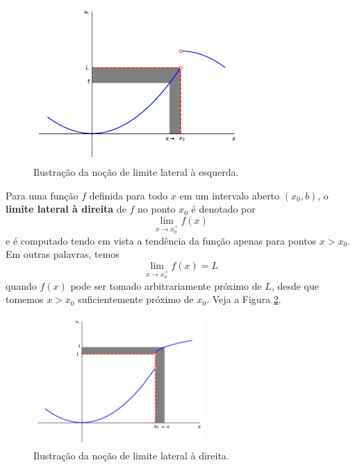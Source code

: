 \cleardoublepage\documentclass[../main.tex]{subfiles}
\begin{document}
\begin{figure}[H]
  \centering
  \includegraphics[width=0.7\textwidth]{fig_lim/fig_lim_esq}
  \caption{Ilustração da noção de limite lateral à esquerda.}
  \label{fig:lim_esq}
\end{figure}

Para uma função $f$ definida para todo $x$ em um intervalo aberto $(x_0, b)$, o {\bf limite lateral à direita} de $f$ no ponto $x_0$ é denotado por
\begin{equation*}
  \lim_{x\to x_0^+} f(x)
\end{equation*}
e é computado tendo em vista a tendência da função apenas para pontos $x>x_0$. Em outras palavras, temos
\begin{equation*}
  \lim_{x\to x_0^+} f(x) = L
\end{equation*}
quando $f(x)$ pode ser tomado arbitrariamente próximo de $L$, desde que tomemos $x>x_0$ suficientemente próximo de $x_0$. Veja a Figura \ref{fig:lim_dir}.

\begin{figure}[H]
  \centering
  \includegraphics[width=0.58\textwidth]{fig_lim/fig_lim_dir}
  \caption{Ilustração da noção de limite lateral à direita.}
  \label{fig:lim_dir}
\end{figure}
\end{document}
